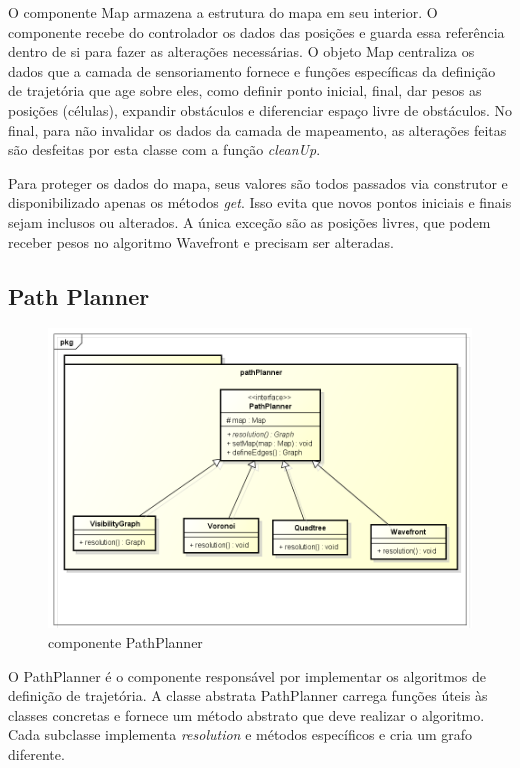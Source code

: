 O componente Map armazena a estrutura do mapa em seu interior. O componente recebe do controlador os dados das posições e guarda essa referência dentro de si para fazer as alterações necessárias. O objeto Map centraliza os dados que a camada de sensoriamento fornece e funções específicas da definição de trajetória que age sobre eles, como definir ponto inicial, final, dar pesos as posições (células), expandir obstáculos e diferenciar espaço livre de obstáculos. No final, para não invalidar os dados da camada de mapeamento, as alterações feitas são desfeitas por esta classe com a função \textit{cleanUp}.

Para proteger os dados do mapa, seus valores são todos passados via construtor e disponibilizado apenas os métodos \textit{get}. Isso evita que novos pontos iniciais e finais sejam inclusos ou alterados. A única exceção são as posições livres, que podem receber pesos no algoritmo Wavefront e precisam ser alteradas.

\subsection{Path Planner}

\begin{figure}[h]
	\centering
	\label{fig25}
		\includegraphics[keepaspectratio=true,scale=0.5]{figuras/pkgpathplanner.png}
	\caption{componente PathPlanner}
\end{figure}

O PathPlanner é o componente responsável por implementar os algoritmos de definição de trajetória. A classe abstrata PathPlanner carrega funções úteis às classes concretas e fornece um método abstrato que deve realizar o algoritmo. Cada subclasse implementa \textit{resolution} e métodos específicos e cria um grafo diferente.

